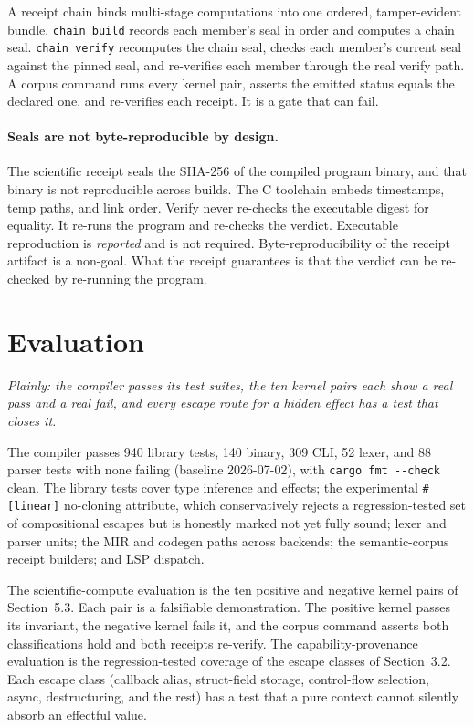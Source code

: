 \documentclass[11pt]{article}
\begin{document}
A receipt chain binds multi-stage computations into one ordered, tamper-evident bundle. \texttt{chain build} records each member's seal in order and computes a chain seal. \texttt{chain verify} recomputes the chain seal, checks each member's current seal against the pinned seal, and re-verifies each member through the real verify path. A corpus command runs every kernel pair, asserts the emitted status equals the declared one, and re-verifies each receipt. It is a gate that can fail.

\paragraph{Seals are not byte-reproducible by design.} The scientific receipt seals the SHA-256 of the compiled program binary, and that binary is not reproducible across builds. The C toolchain embeds timestamps, temp paths, and link order. Verify never re-checks the executable digest for equality. It re-runs the program and re-checks the verdict. Executable reproduction is \emph{reported} and is not required. Byte-reproducibility of the receipt artifact is a non-goal. What the receipt guarantees is that the verdict can be re-checked by re-running the program.

\section{Evaluation}
\emph{Plainly: the compiler passes its test suites, the ten kernel pairs each show a real pass and a real fail, and every escape route for a hidden effect has a test that closes it.}

The compiler passes 940 library tests, 140 binary, 309 CLI, 52 lexer, and 88 parser tests with none failing (baseline 2026-07-02), with \texttt{cargo fmt -{}-check} clean. The library tests cover type inference and effects; the experimental \texttt{\#[linear]} no-cloning attribute, which conservatively rejects a regression-tested set of compositional escapes but is honestly marked not yet fully sound; lexer and parser units; the MIR and codegen paths across backends; the semantic-corpus receipt builders; and LSP dispatch.

The scientific-compute evaluation is the ten positive and negative kernel pairs of Section~5.3. Each pair is a falsifiable demonstration. The positive kernel passes its invariant, the negative kernel fails it, and the corpus command asserts both classifications hold and both receipts re-verify. The capability-provenance evaluation is the regression-tested coverage of the escape classes of Section~3.2. Each escape class (callback alias, struct-field storage, control-flow selection, async, destructuring, and the rest) has a test that a pure context cannot silently absorb an effectful value.
\end{document}
